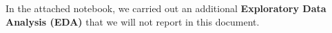 \documentclass{article}
\begin{document}
In the attached notebook, we carried out an additional \textbf{Exploratory Data Analysis (EDA)} that we will not report in this document.

%
%
%
%
%
%
%
%
%
\end{document}
